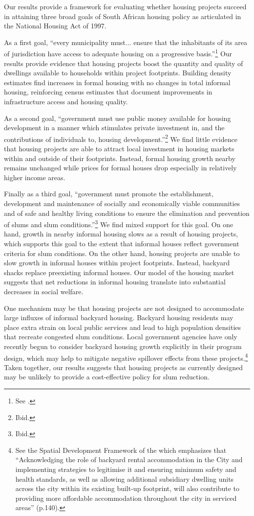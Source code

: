 \documentclass[12pt]{article}
\begin{document}
Our results provide a framework for evaluating whether housing projects succeed in attaining three broad goals of South African housing policy as articulated in the National Housing Act of 1997.

As a first goal, ``every municipality must... ensure that the inhabitants of its area of jurisdiction have access to adequate housing on a progressive basis.''\footnote{See \cite{housingact}.}  Our results provide evidence that housing projects boost the quantity and quality of dwellings available to households within project footprints.  Building density estimates find increases in formal housing with no changes in total informal housing, reinforcing census estimates that document improvements in infrastructure access and housing quality.

As a second goal, ``government must use public money available for housing development in a manner which stimulates private investment in, and the contributions of individuals to, housing development.''\footnote{Ibid.}    We find little evidence that housing projects are able to attract local investment in housing markets within and outside of their footprints.  Instead, formal housing growth nearby remains unchanged while prices for formal houses drop especially in relatively higher income areas.

Finally as a third goal, ``government must promote the establishment, development and maintenance of socially and economically viable communities and of safe and healthy living conditions to ensure the elimination and prevention of slums and slum conditions.''\footnote{Ibid.}  We find mixed support for this goal.  On one hand, growth in nearby informal housing slows as a result of housing projects, which supports this goal to the extent that informal houses reflect government criteria for slum conditions.  On the other hand, housing projects are unable to slow growth in informal houses within project footprints.  Instead, backyard shacks replace preexisting informal houses.  Our model of the housing market suggests that net reductions in informal housing translate into substantial decreases in social welfare.  

One mechanism may be that housing projects are not designed to accommodate large influxes of informal backyard housing.  Backyard housing residents may place extra strain on local public services and lead to high population densities that recreate congested slum conditions.  Local government agencies have only recently begun to consider backyard housing growth explicitly in their program design, which may help to mitigate negative spillover effects from these projects.\footnote{ See the Spatial Development Framework of the \cite{sdf} which emphasizes that ``Acknowledging the role of backyard rental accommodation in the City and implementing strategies to legitimise it and ensuring minimum safety and health standards, as well as allowing additional subsidiary dwelling units across the city within its existing built-up footprint, will also contribute to providing more affordable accommodation throughout the city in serviced areas'' (p.140).}  Taken together, our results suggests that housing projects as currently designed may be unlikely to provide a cost-effective policy for slum reduction. 
\end{document}
